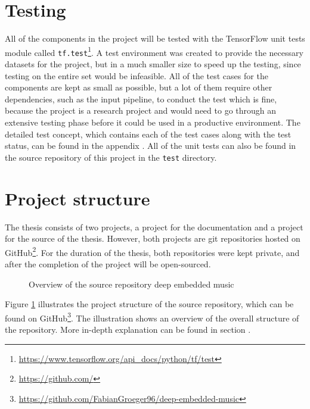 \section{Testing}
\label{sec:Testing}
All of the components in the project will be tested with the TensorFlow unit tests module called \texttt{tf.test}\footnote{\url{https://www.tensorflow.org/api_docs/python/tf/test}}. A test environment was created to provide the necessary datasets for the project, but in a much smaller size to speed up the testing, since testing on the entire set would be infeasible. All of the test cases for the components are kept as small as possible, but a lot of them require other dependencies, such as the input pipeline, to conduct the test which is fine, because the project is a research project and would need to go through an extensive testing phase before it could be used in a productive environment.
\newline
\newline
The detailed test concept, which contains each of the test cases along with the test status, can be found in the appendix . All of the unit tests can also be found in the source repository of this project in the \texttt{test} directory. 

\section{Project structure}
\label{sec:Project-Structure}
The thesis consists of two projects, a project for the documentation and a project for the source of the thesis. However, both projects are git repositories hosted on GitHub\footnote{\url{https://github.com/}}. For the duration of the thesis, both repositories were kept private, and after the completion of the project will be open-sourced.

\begin{figure}[ht]
\caption{Overview of the source repository \flqq deep embedded music\frqq}
\label{fig:Project-Overview-Source}
\end{figure}
\noindent
Figure \ref{fig:Project-Overview-Source} illustrates the project structure of the source repository, which can be found on GitHub\footnote{\url{https://github.com/FabianGroeger96/deep-embedded-music}}. The illustration shows an overview of the overall structure of the repository. More in-depth explanation can be found in section .


